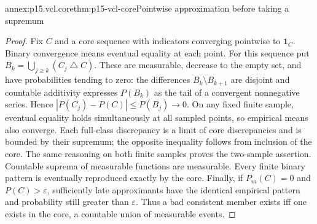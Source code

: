 \begin{annexitem}{annex:p15.vcl.core}{thm:p15-vcl-core}{Pointwise approximation before taking a supremum}
\begin{proof}
Fix \(C\) and a core sequence with indicators converging pointwise to
\(\mathbf1_C\). Binary convergence means eventual equality at each point.
For this sequence put \(B_k=\bigcup_{j\geq k}(C_j\mathbin{\triangle}C)\).
These are measurable, decrease to the empty set, and have probabilities
tending to zero: the differences \(B_k\setminus B_{k+1}\) are disjoint
and countable additivity expresses \(P(B_k)\) as the tail of a convergent
nonnegative series. Hence
\(|P(C_j)-P(C)|\leq P(B_j)\to0\).
On any fixed finite sample, eventual equality holds simultaneously at
all sampled points, so empirical means also converge. Each full-class
discrepancy is a limit of core discrepancies and is bounded by their
supremum; the opposite inequality follows from inclusion of the core.
The same reasoning on both finite samples proves the two-sample assertion.
Countable suprema of measurable functions are measurable.
Every finite binary pattern is eventually reproduced exactly by the core.
Finally, if \(P_m(C)=0\) and \(P(C)>\varepsilon\), sufficiently late
approximants have the identical empirical pattern and probability still
greater than \(\varepsilon\). Thus a bad consistent member exists iff
one exists in the core, a countable union of measurable events.
\end{proof}
\end{annexitem}

